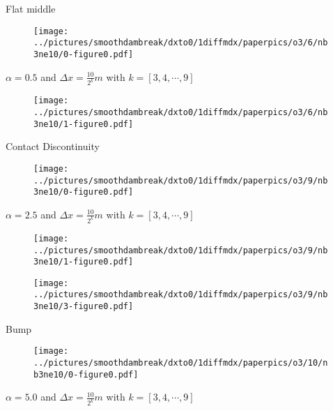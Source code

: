 \documentclass[pdf]{beamer}
\begin{document}
\begin{frame}{Flat middle}
\begin{figure}
\texttt{[image: ../pictures/smoothdambreak/dxto0/1diffmdx/paperpics/o3/6/nb3ne10/0-figure0.pdf]}
\end{figure}
$\alpha = 0.5$ and $\Delta x = \frac{10}{2^k} m$ with $k = [3,4,\cdots,9]$
\end{frame}

\begin{frame}{}
\begin{figure}
\texttt{[image: ../pictures/smoothdambreak/dxto0/1diffmdx/paperpics/o3/6/nb3ne10/1-figure0.pdf]}
\end{figure}
\end{frame}

\begin{frame}{Contact Discontinuity}
\begin{figure}
\texttt{[image: ../pictures/smoothdambreak/dxto0/1diffmdx/paperpics/o3/9/nb3ne10/0-figure0.pdf]}
\end{figure}
$\alpha = 2.5$ and $\Delta x = \frac{10}{2^k} m$ with $k = [3,4,\cdots,9]$
\end{frame}

\begin{frame}{}
\begin{figure}
\texttt{[image: ../pictures/smoothdambreak/dxto0/1diffmdx/paperpics/o3/9/nb3ne10/1-figure0.pdf]}
\end{figure}
\end{frame}

\begin{frame}{}
\begin{figure}
\texttt{[image: ../pictures/smoothdambreak/dxto0/1diffmdx/paperpics/o3/9/nb3ne10/3-figure0.pdf]}
\end{figure}
\end{frame}

\begin{frame}{Bump}
\begin{figure}
\texttt{[image: ../pictures/smoothdambreak/dxto0/1diffmdx/paperpics/o3/10/nb3ne10/0-figure0.pdf]}
\end{figure}
$\alpha = 5.0$ and $\Delta x = \frac{10}{2^k} m$ with $k = [3,4,\cdots,9]$
\end{frame}
\end{document}
